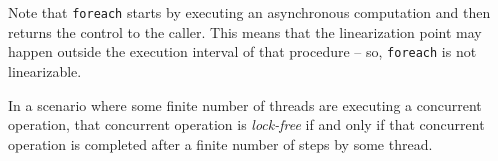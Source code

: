\documentclass[runningheads,a4paper]{llncs}
\begin{document}
Note that \verb=foreach= starts by executing an asynchronous
computation and then returns the control to the caller. This means
that the linearization point may happen outside the execution interval
of that procedure -- so, \verb=foreach= is not linearizable.







\begin{definition}\label{def-lock-freedom} 
In a scenario where some finite number of threads are executing a concurrent
operation, that concurrent operation is \textit{lock-free} if and only if that
concurrent operation is completed after a finite number of steps by some
thread. 
\end{definition}
\end{document}
